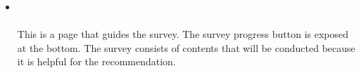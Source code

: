 \documentclass[conference]{IEEEtran}
\begin{document}
\begin{enumerate}
\begin{enumerate}
\begin{itemize}
        \item[] \\ \\ This is a page that guides the survey. The survey progress button is exposed at the bottom. The survey consists of contents that will be conducted because it is helpful for the recommendation. \\ \\ \\ \\ \\ \\ \\ \\ \\ \\ \\ \\ \\ \\ \\ \\ \\ \\


\end{itemize}
\end{enumerate}
\end{enumerate}
\end{document}
